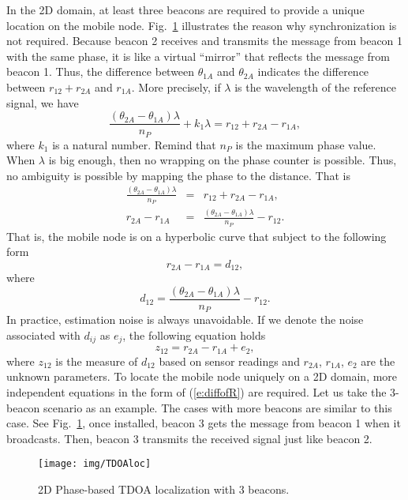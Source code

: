 In the 2D domain, at least three beacons are required to provide a unique location on the mobile node.
 Fig.~\ref{f:tdoaPhase} illustrates the reason why synchronization is not required.
  Because beacon 2 receives and transmits the message from beacon 1 with the same phase, it is like a virtual ``mirror'' that reflects the message from beacon 1. Thus, the difference between $\theta_{1A}$ and $\theta_{2A}$ indicates the difference between $r_{12}+ r_{2A}$
    and $r_{1A}$. More precisely, if $\lambda$ is the wavelength of the reference signal, we have
    $$\frac{(\theta_{2A}-\theta_{1A})\lambda}{n_P}+k_1\lambda = r_{12}+r_{2A}-r_{1A}, $$
where $k_1$ is a natural number. Remind that $n_P$ is the maximum phase value. When $\lambda$  is big enough, then no wrapping on the phase counter is possible. Thus, no ambiguity is possible by mapping the phase to the distance. That is
\begin{eqnarray*}
  \frac{(\theta_{2A}-\theta_{1A})\lambda}{n_P} &=& r_{12}+r_{2A}-r_{1A}, \\
  r_{2A}-r_{1A} &=& \frac{(\theta_{2A}-\theta_{1A})\lambda}{n_P} - r_{12}.
\end{eqnarray*}
That is, the mobile node is on a hyperbolic curve that subject to the following form
\begin{equation}\label{e:diffofR}
    r_{2A}-r_{1A}=d_{12},
\end{equation}
where
\begin{equation*}
d_{12} = \frac{(\theta_{2A}-\theta_{1A})\lambda}{n_P} - r_{12}.
\end{equation*}
In practice, estimation noise is always unavoidable. If we denote the noise associated with $d_{ij}$ as $e_j$, the following equation holds
\begin{equation}\label{e:deij}
z_{12}= r_{2A}-r_{1A}+e_2,
\end{equation}
where $z_{12}$ is the measure of $d_{12}$ based on sensor readings and $r_{2A}$, $r_{1A}$, $e_2$ are the unknown parameters.
    To locate the mobile node uniquely on a 2D domain, more independent equations in the form of (\ref{e:diffofR}) are required. Let us take the 3-beacon scenario as an example. The cases with more beacons are similar to this case. See Fig.~\ref{f:tdoaPhase}, once installed, beacon 3 gets the message from beacon 1 when it broadcasts. Then, beacon 3 transmits the received signal just like beacon 2.



\begin{figure}
  \centering
  \texttt{[image: img/TDOAloc]}\\
  \caption{2D Phase-based TDOA localization with 3 beacons.}\label{f:tdoaPhase}
\end{figure}



